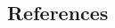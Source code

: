 \documentclass[twoside]{article}
\begin{document}
\begin{multicols}{2}
\begin{comment}
In addition, in order to determine the
expected length of commands, we will ask for qualitative feedback about the
usefulness of the system and a description of anticipated tasks.
\end{comment}

\section{References}

\begin{spacing}{0.9}
%
\begingroup
\renewcommand{\section}[2]{}%

\endgroup
\end{spacing}

\end{multicols}
\end{document}
